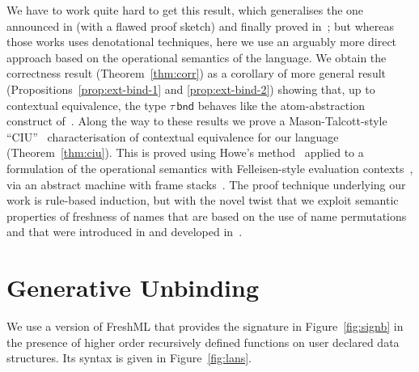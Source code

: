 \documentclass{LMCS}
\theoremstyle{plain}
\theoremstyle{definition}
\newcommand{\BINDTY}{\kw{bnd}}
\newcommand{\kw}[1]{\mathsf{#1}}
\newcommand{\ty}{\tau}
\begin{document}
We have to work quite hard to get this result, which generalises the
one announced in \cite{PittsAM:frepbm} (with a flawed proof sketch)
and finally proved in~\cite{PittsAM:monsf,ShinwellMR:freafp}; but
whereas those works uses denotational techniques, here we use an
arguably more direct approach based on the operational semantics of
the language. We obtain the correctness result
(Theorem~\ref{thm:corr}) as a corollary of more general result
(Propositions~\ref{prop:ext-bind-1} and \ref{prop:ext-bind-2}) showing
that, up to contextual equivalence, the type $\ty\,\BINDTY$ behaves
like the atom-abstraction construct
of~\cite[Sect.~5]{PittsAM:newaas-jv}.  Along the way to these results
we prove a Mason-Talcott-style ``CIU''~\cite{MasonIA:equfle}
characterisation of contextual equivalence for our language
(Theorem~\ref{thm:ciu}).  This is proved using Howe's
method~\cite{HoweDJ:procbf} applied to a formulation of the
operational semantics with Felleisen-style evaluation
contexts~\cite{FelleisenM:revrst}, via an abstract machine with frame
stacks~\cite{PittsAM:opespe}. The proof technique underlying our work
is rule-based induction, but with the novel twist that we exploit
semantic properties of freshness of names that are based on the use of
name permutations and that were introduced in \cite{PittsAM:newaas-jv}
and developed
in~\cite{PittsAM:nomlfo-jv,UrbanC:fortbv,PittsAM:alpsri}.

\section{Generative Unbinding}
\label{sec:generative-unbinding}


We use a version of FreshML that provides the signature in
Figure~\ref{fig:signb} in the presence of higher order recursively
defined functions on user declared data structures. Its syntax is
given in Figure~\ref{fig:lans}.
\end{document}
